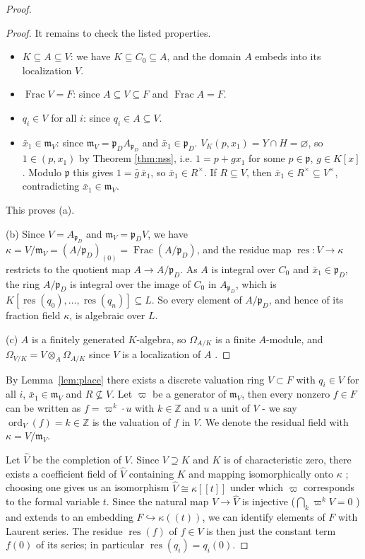 \documentclass[pdflatex,sn-mathphys-num]{sn-jnl}
\numberwithin{equation}{section}
\theoremstyle{thmstyleone}
\theoremstyle{thmstyletwo}
\begin{document}
\begin{proof}
\begin{proof}
It remains to check the listed properties.
\begin{itemize}
\item $K\subseteq A\subseteq V$: we have $K\subseteq C_0\subseteq A$, and the
domain $A$ embeds into its localization $V$.
\item $\operatorname{Frac}V=F$: since $A\subseteq V\subseteq F$ and
$\operatorname{Frac}A=F$.
\item $q_i\in V$ for all $i$: since $q_i\in A\subseteq V$.
\item $\bar x_1\in\mathfrak m_V$: since $\mathfrak m_V=\mathfrak p_DA_{\mathfrak p_D}$
and $\bar x_1\in\mathfrak p_D$. $V_K(p, x_1) = Y \cap H = \varnothing$, so $1 \in (p, x_1)$ by Theorem \ref{thm:nss}, i.e. $1=p+gx_1$ for some $p\in\mathfrak p$, $g\in K[x]$. Modulo
$\mathfrak p$ this gives $1=\bar g\,\bar x_1$, so $\bar x_1\in R^\times$.
If $R\subseteq V$, then $\bar x_1\in R^\times\subseteq V^\times$, contradicting
$\bar x_1\in\mathfrak m_V$.
\end{itemize}
This proves (a).

(b) Since $V=A_{\mathfrak p_D}$ and $\mathfrak m_V=\mathfrak p_DV$, we have
$\kappa=V/\mathfrak m_V=(A/\mathfrak p_D)_{(0)}=\operatorname{Frac}(A/\mathfrak p_D)$,
and the residue map $\operatorname{res}:V\to\kappa$ restricts to the quotient map $A\to A/\mathfrak p_D$. As $A$ is integral over $C_0$ and $\bar x_1\in\mathfrak p_D$, the ring $A/\mathfrak p_D$ is integral over the image of
$C_0$ in $A_{\mathfrak p_D}$, which is
$K[\operatorname{res}(q_0),\dots,\operatorname{res}(q_n)]\subseteq L$. So every element of
$A/\mathfrak p_D$, and hence of its fraction field $\kappa$, is algebraic over $L$.

(c) $A$ is a finitely generated $K$-algebra, so $\Omega_{A/K}$ is a finite
$A$-module, and $\Omega_{V/K}=V\otimes_A\Omega_{A/K}$ since $V$ is a localization of $A$ \cite[Prop II.8.2A]{hartshorne}.
\end{proof}

By Lemma~\ref{lem:place} there exists a discrete valuation ring $V\subset F$ with
$q_i\in V$ for all $i$, $\bar x_1\in\mathfrak m_V$ and $R\not\subseteq V$. Let $\varpi$ be a
generator of $\mathfrak m_V$, then every nonzero $f \in F$ can be written as $f = \varpi^k\cdot u$ with $k \in \mathbb{Z}$ and $u$ a unit of $V$ - we say $\operatorname{ord}_V(f) = k \in \mathbb Z$ is the valuation of $f$ in $V$. We denote the residual field with $\kappa=V/\mathfrak m_V$.

Let $\widehat V$ be the completion of $V$. Since $V\supseteq K$
and $K$ is of characteristic zero, there exists a coefficient field of $\widehat V$
containing $K$ and mapping isomorphically onto $\kappa$ \cite[Thm. 28.3]{matsumura};
choosing one gives us an isomorphism $\widehat V\cong\kappa[[t]]$ under which
$\varpi$ corresponds to the formal variable $t$. Since the natural map $V\to\widehat V$ is injective ($\bigcap_k\varpi^kV=0$ \cite[Corr. 10.20]{atiyah}) and extends to an embedding $F\hookrightarrow\kappa((t))$, we can identify elements of $F$ with
Laurent series. The residue $\operatorname{res}(f)$ of $f \in V$ is then just the constant term $f(0)$ of its series; in particular $\operatorname{res}(q_i) = q_i(0).$


\end{proof}
\end{document}
